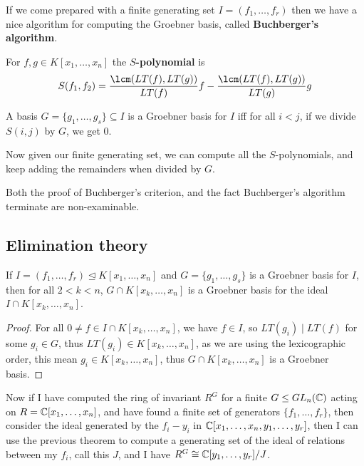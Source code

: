 \documentclass{article}
\begin{document}
If we come prepared with a finite generating set $I = (f_1,\ldots, f_r)$ then we have a nice algorithm for computing the Groebner basis, called \textbf{Buchberger's algorithm}.

\begin{definition}
    For $f,g\in K[x_1,\ldots,x_n]$ the \textbf{$S$-polynomial} is \[
    S(f_1,f_2) = \frac{\lcm(LT(f),LT(g))}{LT(f)}f - \frac{\lcm(LT(f),LT(g))}{LT(g)}g
    \]
\end{definition}

\begin{theorem}
    A basis $G = \{g_1,\ldots, g_s\}\subseteq I$ is a Groebner basis for $I$ iff for all $i<j$, if we divide $S(i,j)$ by $G$, we get $0$.
\end{theorem}

Now given our finite generating set, we can compute all the $S$-polynomials, and keep adding the remainders when divided by $G$.

Both the proof of Buchberger's criterion, and the fact Buchberger's algorithm terminate are non-examinable.

\subsection{Elimination theory}

\begin{theorem}
    If $I = (f_1,\ldots, f_r)\unlhd K[x_1,\ldots, x_n]$ and $G = \{g_1,\ldots, g_s\}$ is a Groebner basis for $I$, then for all $2<k<n$, $G\cap K[x_k,\ldots, x_n]$ is a Groebner basis for the ideal $I\cap K[x_k,\ldots,x_n]$.
    \begin{proof}
        For all $0\neq f \in I\cap K[x_k,\ldots, x_n]$, we have $f\in I$, so $LT(g_i)\mid LT(f)$ for some $g_i\in G$, thus $LT(g_i)\in K[x_k,\ldots, x_n]$, as we are using the lexicographic order, this mean $g_i \in K[x_k,\ldots, x_n]$, thus $G\cap K[x_k,\ldots,x_n]$ is a Groebner basis.
    \end{proof}
\end{theorem}

Now if I have computed the ring of invariant $R^G$ for a finite $G\leq GL_n(\mathbb{C})$ acting on $R = \mathbb{C}[x_1,\ldots, x_n]$, and have found a finite set of generators $\{f_1,\ldots, f_r\}$, then consider the ideal generated by the $f_i-y_i$ in $\mathbb{C}[x_1,\ldots,x_n,y_1,\ldots,y_r]$, then I can use the previous theorem to compute a generating set of the ideal of relations between my $f_i$, call this $J$, and I have $R^G\cong \mathbb{C}[y_1,\ldots,y_r]/J$.
\end{document}
